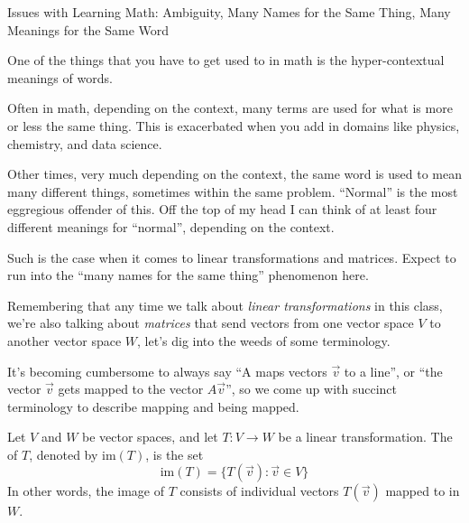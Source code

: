 \documentclass{ximera}
\begin{document}
\begin{remark}{Issues with Learning Math: Ambiguity, Many Names for the Same Thing, Many Meanings for the Same Word}

  One of the things that you have to get used to in math is the hyper-contextual meanings of words. 

  Often in math, depending on the context, many terms are used for what is more or less the same thing. This is exacerbated when you add in domains like physics, chemistry, and data science. 

  Other times, very much depending on the context, the same word is used to mean many different things, sometimes within the same problem. ``Normal'' is the most eggregious offender of this. Off the top of my head I can think of at least four different meanings for ``normal'', depending on the context.

  Such is the case when it comes to linear transformations and matrices. Expect to run into the ``many names for the same thing'' phenomenon here. 

\end{remark}

Remembering that any time we talk about \emph{linear transformations} in this class, we're also talking about \emph{matrices} that send vectors from one vector space $V$ to another vector space $W$, let's dig into the weeds of some terminology.

It's becoming cumbersome to always say ``A maps vectors $\vec{v}$ to a line'', or ``the vector $\vec{v}$ gets mapped to the vector $A\vec{v}$'', so we come up with succinct terminology to describe mapping and being mapped. 

\begin{definition}\label{def:imageofT}
Let $V$ and $W$ be vector spaces, and let $T:V\rightarrow W$ be a linear transformation.  The  of $T$, denoted by $\mbox{im}(T)$, is the set
$$\mbox{im}(T)=\{T(\vec{v}):\vec{v}\in V\}$$
In other words, the image of $T$ consists of individual vectors $T(\vec{v})$ mapped to in $W$.
\end{definition}
 
\end{document}
